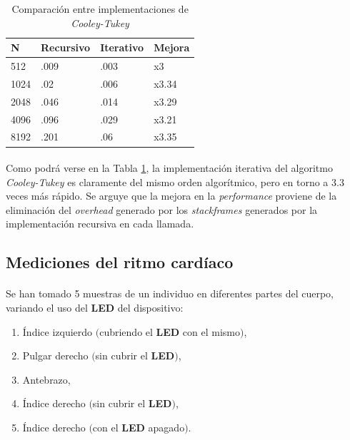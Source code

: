 \documentclass[12pt, twocolumn]{article}
\begin{document}
	\begin{table}[H]
		\centering
		\begin{tabular}{@{}llll@{}}
			\toprule
			N    & Recursivo & Iterativo & Mejora \\ \midrule
			512  & .009      & .003      & x3     \\
			1024 & .02       & .006      & x3.34  \\
			2048 & .046      & .014      & x3.29  \\
			4096 & .096      & .029      & x3.21  \\
			8192 & .201      & .06       & x3.35  \\ \bottomrule
		\end{tabular}
		\caption{Comparación entre implementaciones de \textit{Cooley-Tukey}}
		\label{fftcmp}
	\end{table}
	
	\paragraph{} Como podrá verse en la Tabla \ref{fftcmp}, la implementación iterativa del algoritmo \textit{Cooley-Tukey} es claramente del mismo orden algorítmico, pero en torno a $3.3$ veces más rápido. Se arguye que la mejora en la \textit{performance} proviene de la eliminación del \textit{overhead} generado por los \textit{stackframes} generados por la implementación recursiva en cada llamada.
	
	
	\subsection{Mediciones del ritmo cardíaco}
	
	\paragraph{} Se han tomado 5 muestras de un individuo en diferentes partes del cuerpo, variando el uso del \textbf{LED} del dispositivo:
	
	\begin{enumerate}
		\item Índice izquierdo $($cubriendo el \textbf{LED} con el mismo$)$,
		\item Pulgar derecho $($sin cubrir el \textbf{LED}$)$,
		\item Antebrazo,
		\item Índice derecho $($sin cubrir el \textbf{LED}$)$,
		\item Índice derecho $($con el \textbf{LED} apagado$)$.
	\end{enumerate}
	
\end{document}
